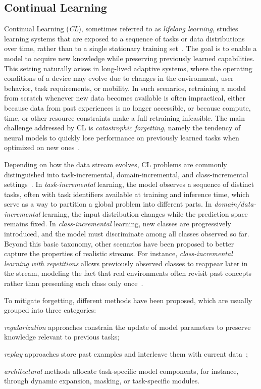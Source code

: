 \documentclass[conference]{IEEEtran}
\theoremstyle{plain}
\theoremstyle{definition}
\begin{document}
\subsection{Continual Learning}
Continual Learning (\emph{CL}), 
 sometimes referred to as \emph{lifelong learning}, 
 studies learning systems that are exposed to a sequence of tasks or data distributions over time, 
 rather than to a single stationary training set~\cite{DBLP:journals/nn/ParisiKPKW19}. 
% 
The goal is to enable a model to acquire new knowledge while preserving previously learned capabilities. 
 This setting naturally arises in long-lived adaptive systems, 
 where the operating conditions of a device may evolve due to changes in the environment, 
 user behavior, task requirements, or mobility. 
% 
In such scenarios, 
 retraining a model from scratch whenever new data becomes available is often impractical, 
 either because data from past experiences is no longer accessible, 
 or because compute, time, 
 or other resource constraints make a full retraining infeasible. 
% 
The main challenge addressed by \ac{CL} is \emph{catastrophic forgetting}, 
 namely the tendency of neural models to quickly lose performance on previously learned tasks when optimized on new ones~\cite{french1999catastrophic}.

Depending on how the data stream evolves, 
 \ac{CL} problems are commonly distinguished into task-incremental, domain-incremental, and class-incremental settings~\cite{vandeven2022three}. 
 In \emph{task-incremental} learning, 
 the model observes a sequence of distinct tasks, 
 often with task identifiers available at training and inference time, 
 which serve as a way to partition a global problem into different parts. 
% 
In \emph{domain/data-incremental} learning, the input distribution changes while the prediction space remains fixed. 
%
In \emph{class-incremental} learning, 
 new classes are progressively introduced, 
 and the model must discriminate among all classes observed so far. 
% 
Beyond this basic taxonomy, 
 other scenarios have been proposed to better capture the properties of realistic streams. 
 For instance, \emph{class-incremental learning with repetitions} allows previously observed classes to reappear later in the stream, 
 modeling the fact that real environments often revisit past concepts rather than presenting each class only once~\cite{hemati2023class}.

To mitigate forgetting, 
 different methods have been proposed, which are usually grouped into three categories:
 \begin{enumerate*}[label=(\roman*)]
     \item \emph{regularization} approaches constrain the update of model parameters to preserve knowledge relevant to previous tasks; 
     \item \emph{replay} approaches store past examples and interleave them with current data~\cite{lopezpaz2017gradient,rebuffi2017icarl}; 
     \item \emph{architectural} methods allocate task-specific model components, for instance, through dynamic expansion, masking, or task-specific modules.
 \end{enumerate*} 
 
\end{document}
